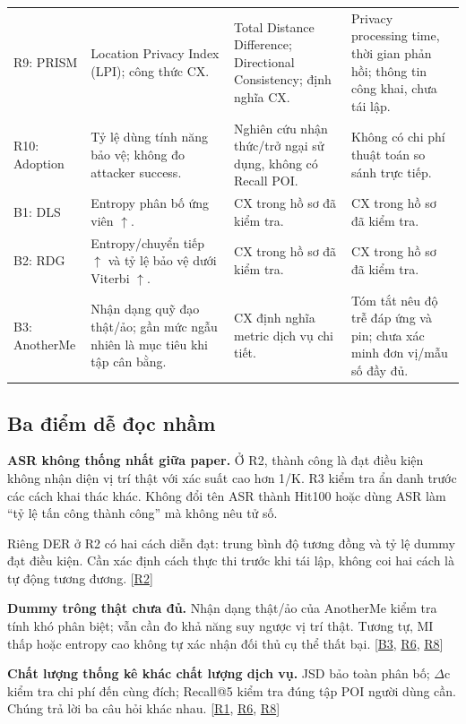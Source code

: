 \documentclass[10pt,a4paper]{article}
\begin{document}
\begin{longtable}{@{}P{2.710cm}P{4.936cm}P{4.065cm}P{4.646cm}@{}}
R9: PRISM & Location Privacy Index (LPI); công thức CX. & Total Distance Difference; Directional Consistency; định nghĩa CX. & Privacy processing time, thời gian phản hồi; thông tin công khai, chưa tái lập.\\
\addlinespace[3pt]
R10: Adoption & Tỷ lệ dùng tính năng bảo vệ; không đo attacker success. & Nghiên cứu nhận thức/trở ngại sử dụng, không có Recall POI. & Không có chi phí thuật toán so sánh trực tiếp.\\
\addlinespace[3pt]
B1: DLS & Entropy phân bố ứng viên $\uparrow$. & CX trong hồ sơ đã kiểm tra. & CX trong hồ sơ đã kiểm tra.\\
\addlinespace[3pt]
B2: RDG & Entropy/chuyển tiếp $\uparrow$ và tỷ lệ bảo vệ dưới Viterbi $\uparrow$. & CX trong hồ sơ đã kiểm tra. & CX trong hồ sơ đã kiểm tra.\\
\addlinespace[3pt]
B3: AnotherMe & Nhận dạng quỹ đạo thật/ảo; gần mức ngẫu nhiên là mục tiêu khi tập cân bằng. & CX định nghĩa metric dịch vụ chi tiết. & Tóm tắt nêu độ trễ đáp ứng và pin; chưa xác minh đơn vị/mẫu số đầy đủ.\\
\end{longtable}
\endgroup
\subsection{Ba điểm dễ đọc nhầm}
\textbf{ASR không thống nhất giữa paper.} Ở R2, thành công là đạt điều kiện không nhận diện vị trí thật với xác suất cao hơn 1/K. R3 kiểm tra ẩn danh trước các cách khai thác khác. Không đổi tên ASR thành Hit100 hoặc dùng ASR làm “tỷ lệ tấn công thành công” mà không nêu tử số.

Riêng DER ở R2 có hai cách diễn đạt: trung bình độ tương đồng và tỷ lệ dummy đạt điều kiện. Cần xác định cách thực thi trước khi tái lập, không coi hai cách là tự động tương đương. [\hyperlink{ref-R2}{R2}]

\textbf{Dummy trông thật chưa đủ.} Nhận dạng thật/ảo của AnotherMe kiểm tra tính khó phân biệt; vẫn cần đo khả năng suy ngược vị trí thật. Tương tự, MI thấp hoặc entropy cao không tự xác nhận đối thủ cụ thể thất bại. [\hyperlink{ref-B3}{B3}, \hyperlink{ref-R6}{R6}, \hyperlink{ref-R8}{R8}]

\textbf{Chất lượng thống kê khác chất lượng dịch vụ.} JSD bảo toàn phân bố; $\Delta$c kiểm tra chi phí đến cùng đích; Recall@5 kiểm tra đúng tập POI người dùng cần. Chúng trả lời ba câu hỏi khác nhau. [\hyperlink{ref-R1}{R1}, \hyperlink{ref-R6}{R6}, \hyperlink{ref-R8}{R8}]
\end{document}
